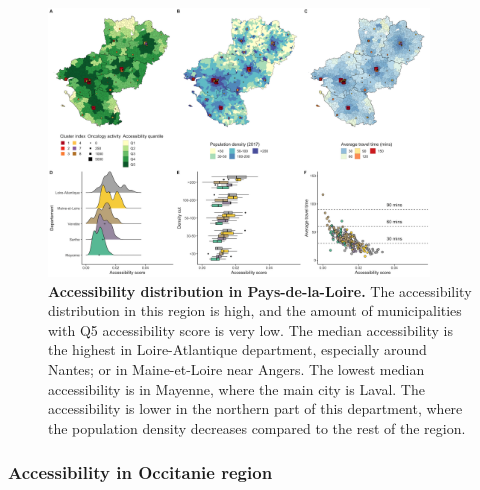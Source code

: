\begin{figure}[h!]
    \includegraphics[width=0.9\textwidth]{images/camion/region_accessibility/accessibility_Pays-de-la-Loire.png}
    \centering
    \caption{
        \textbf{Accessibility distribution in Pays-de-la-Loire.} The accessibility distribution
        in this region is high, and the amount of municipalities with Q5 accessibility
        score is very low. The median accessibility is the highest in Loire-Atlantique
        department, especially around Nantes; or in Maine-et-Loire near Angers. The
        lowest median accessibility is in Mayenne, where the main city is Laval. The
        accessibility is lower in the northern part of this department, where the
        population density decreases compared to the rest of the region.
    }
\end{figure}

\subsubsection{Accessibility in Occitanie region}

